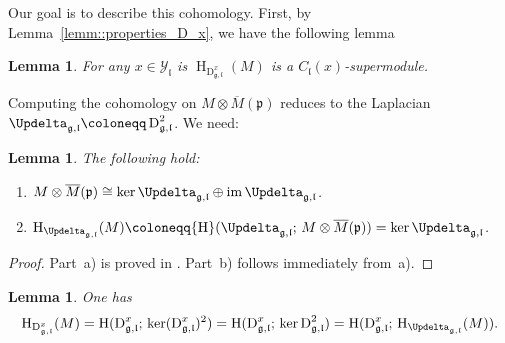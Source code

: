 \documentclass[11pt]{amsart}
\renewcommand{\Im}{\operatorname{im}}
\newcommand{\Dirac}{\operatorname{D}}
\def\pp{{\mathfrak p}}
\def\H{{\operatorname{H}}}
\def\Dx{{\operatorname{D}_{\gg,\ll}^{x}}}
\def\ll{{\mathfrak l}}
\def\YY{{\mathcal Y}}
\def\pp{{\mathfrak p}}
\def\pp{{\mathfrak{p}}}
\def\gg{{\mathfrak{g}}}
\theoremstyle{plain}
\newtheorem{lemma}[theorem]{Lemma}
\theoremstyle{remark}
\theoremstyle{definition}
\numberwithin{equation}{section}
\theoremstyle{remark}
\begin{document}
Our goal is to describe this cohomology. First, by Lemma~\ref{lemm::properties_D_x}, we have the following lemma

\begin{lemma}
 For any $x \in \YY_{\ll}$ is $\H_{\Dx}(M)$ is a $C_{\ll}(x)$-supermodule.
\end{lemma}

Computing the cohomology on $M\otimes \overline{M}(\pp)$ reduces to the Laplacian
$\Updelta_{\gg,\ll}\coloneqq \Dirac_{\gg,\ll}^{2}$. We need:

\begin{lemma}\label{lemm::decomposition_under_Laplace}
The following hold:
\begin{enumerate}
\item[a)] $M\otimes \overline{M}(\pp)\cong \ker \Updelta_{\gg,\ll}\oplus \Im \Updelta_{\gg,\ll}$.
\item[b)] $\H_{\Updelta_{\gg,\ll}}(M)\coloneqq \H(\Updelta_{\gg,\ll};\,M\otimes \overline{M}(\pp))=\ker \Updelta_{\gg,\ll}$.
\end{enumerate}
\end{lemma}

\begin{proof}
Part~a) is proved in \cite[Proposition~4.1.2]{Schmidt_Noja}. Part~b) follows immediately from~a).
\end{proof}

\begin{lemma}\label{lemm::cohomology_restriction}
One has
\[
\H_{\Dx}(M)=\H(\Dx;\,\ker(\Dx)^{2})
=\H(\Dx;\,\ker \Dirac_{\gg,\ll}^{2})
=\H(\Dx;\,\H_{\Updelta_{\gg,\ll}}(M)).
\]
\end{lemma}
\end{document}
